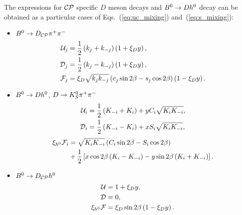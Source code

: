 \documentclass[a4paper,11pt]{article}
\begin{document}
The expressions for $\mathcal{CP}$ specific $D$ meson decays and $B^0\to D h^0$ decay 
can be obtained as a particular cases of Eqs.~(\ref{eq:uc_mixing}) and~(\ref{eq:s_mixing}):
\begin{itemize}
 \item $B^0\to D_{\mathcal{CP}}\pi^+\pi^-$
 \begin{subequations}\label{eq:ucs_bdpp_dcp_mixing}
 \begin{align}
  \label{eq:u_bdpp_dcp_mixing}
  \mathcal{U}_{j} &= \frac{1}{2}\left(k_j + k_{-j}\right)\left( 1+ \xi_D y\right), \\ 
  \label{eq:c_bdpp_dcp_mixing}
  \mathcal{D}_{j} &= \frac{1}{2}\left(k_j - k_{-j}\right)\left( 1+ \xi_D y\right), \\
  \label{eq:s_bdpp_dcp_mixing}
  \mathcal{F}_{j} &= \xi_D\sqrt{k_jk_{-j}}\left(c_j\sin{2\beta} - s_j\cos{2\beta}\right)\left( 1 - \xi_D y\right).
 \end{align}
\end{subequations}
 \item $B^0\to D h^0$, $D\to K_S^0\pi^+\pi^-$
 \begin{subequations}\label{eq:uc_bdh_mixing}
 \begin{align}
  \label{eq:u_bdh_mixing}
  \mathcal{U}_{i} &= \frac{1}{2}\left( K_{-i} + K_i \right) + yC_i\sqrt{K_iK_{-i}}, \\ 
  \label{eq:c_bdh_mixing}
  \mathcal{D}_{i} &= \frac{1}{2}\left( K_{-i} - K_i \right) + xS_i\sqrt{K_iK_{-i}},
 \end{align}
\end{subequations}
\begin{equation}\label{eq:s_bdh_mixing}
 \begin{split}
  \xi_{h^0}\mathcal{F}_{i} &= \sqrt{K_iK_{-i}}\left(C_i\sin{2\beta} - S_i\cos{2\beta}\right) \\
             &+ \frac{1}{2}\left[x\cos{2\beta} \left( K_i - K_{-i} \right) -
                                 y\sin{2\beta} \left( K_i + K_{-i} \right) \right].
 \end{split}
\end{equation}
 \item $B^0\to D_{\mathcal{CP}} h^0$
 \begin{subequations}\label{eq:ucs_bdh_dcp_mixing}
 \begin{align}
  \label{eq:u_bdh_dcp_mixing}
  \mathcal{U} &= 1 + \xi_D y, \\ 
  \label{eq:c_bdh_dcp_mixing}
  \mathcal{D} &= 0, \\
  \label{eq:s_bdh_dcp_mixing}
  \xi_{h^0}\mathcal{F} &= \xi_D\sin{2\beta}\left( 1 - \xi_D y \right).
 \end{align}
\end{subequations}
\end{itemize}
\end{document}
